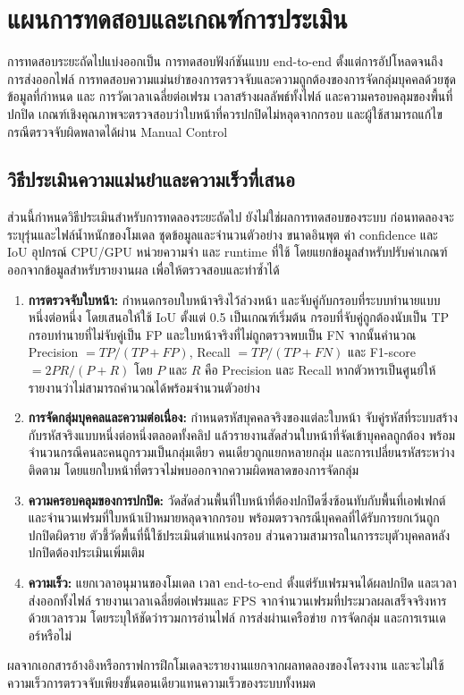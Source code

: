\section{แผนการทดสอบและเกณฑ์การประเมิน}

การทดสอบระยะถัดไปแบ่งออกเป็น การทดสอบฟังก์ชันแบบ end-to-end ตั้งแต่การอัปโหลดจนถึงการส่งออกไฟล์ การทดสอบความแม่นยำของการตรวจจับและความถูกต้องของการจัดกลุ่มบุคคลด้วยชุดข้อมูลที่กำหนด และ การวัดเวลาเฉลี่ยต่อเฟรม เวลาสร้างผลลัพธ์ทั้งไฟล์ และความครอบคลุมของพื้นที่ปกปิด เกณฑ์เชิงคุณภาพจะตรวจสอบว่าใบหน้าที่ควรปกปิดไม่หลุดจากกรอบ และผู้ใช้สามารถแก้ไขกรณีตรวจจับผิดพลาดได้ผ่าน Manual Control

\subsection{วิธีประเมินความแม่นยำและความเร็วที่เสนอ}

ส่วนนี้กำหนดวิธีประเมินสำหรับการทดลองระยะถัดไป ยังไม่ใช่ผลการทดสอบของระบบ ก่อนทดลองจะระบุรุ่นและไฟล์น้ำหนักของโมเดล ชุดข้อมูลและจำนวนตัวอย่าง ขนาดอินพุต ค่า confidence และ IoU อุปกรณ์ CPU/GPU หน่วยความจำ และ runtime ที่ใช้ โดยแยกข้อมูลสำหรับปรับค่าเกณฑ์ออกจากข้อมูลสำหรับรายงานผล เพื่อให้ตรวจสอบและทำซ้ำได้

\begin{enumerate}[
  label=(\arabic*),
  labelindent=0pt,
  leftmargin=\firstindentlength,
  labelwidth=0.65\firstindentlength,
  labelsep=0.35\firstindentlength,
  itemindent=0pt,
  align=left,
  listparindent=0pt,
  topsep=0.4\baselineskip,
  itemsep=0.4\baselineskip,
  parsep=0pt
]
  \item \textbf{การตรวจจับใบหน้า:} กำหนดกรอบใบหน้าจริงไว้ล่วงหน้า และจับคู่กับกรอบที่ระบบทำนายแบบหนึ่งต่อหนึ่ง โดยเสนอให้ใช้ IoU ตั้งแต่ 0.5 เป็นเกณฑ์เริ่มต้น กรอบที่จับคู่ถูกต้องนับเป็น TP กรอบทำนายที่ไม่จับคู่เป็น FP และใบหน้าจริงที่ไม่ถูกตรวจพบเป็น FN จากนั้นคำนวณ Precision $=TP/(TP+FP)$, Recall $=TP/(TP+FN)$ และ F1-score $=2PR/(P+R)$ โดย $P$ และ $R$ คือ Precision และ Recall หากตัวหารเป็นศูนย์ให้รายงานว่าไม่สามารถคำนวณได้พร้อมจำนวนตัวอย่าง
  \item \textbf{การจัดกลุ่มบุคคลและความต่อเนื่อง:} กำหนดรหัสบุคคลจริงของแต่ละใบหน้า จับคู่รหัสที่ระบบสร้างกับรหัสจริงแบบหนึ่งต่อหนึ่งตลอดทั้งคลิป แล้วรายงานสัดส่วนใบหน้าที่จัดเข้าบุคคลถูกต้อง พร้อมจำนวนกรณีคนละคนถูกรวมเป็นกลุ่มเดียว คนเดียวถูกแยกหลายกลุ่ม และการเปลี่ยนรหัสระหว่างติดตาม โดยแยกใบหน้าที่ตรวจไม่พบออกจากความผิดพลาดของการจัดกลุ่ม
  \item \textbf{ความครอบคลุมของการปกปิด:} วัดสัดส่วนพื้นที่ใบหน้าที่ต้องปกปิดซึ่งซ้อนทับกับพื้นที่เอฟเฟกต์ และจำนวนเฟรมที่ใบหน้าเป้าหมายหลุดจากกรอบ พร้อมตรวจกรณีบุคคลที่ได้รับการยกเว้นถูกปกปิดผิดราย ตัวชี้วัดพื้นที่นี้ใช้ประเมินตำแหน่งกรอบ ส่วนความสามารถในการระบุตัวบุคคลหลังปกปิดต้องประเมินเพิ่มเติม
  \item \textbf{ความเร็ว:} แยกเวลาอนุมานของโมเดล เวลา end-to-end ตั้งแต่รับเฟรมจนได้ผลปกปิด และเวลาส่งออกทั้งไฟล์ รายงานเวลาเฉลี่ยต่อเฟรมและ FPS จากจำนวนเฟรมที่ประมวลผลเสร็จจริงหารด้วยเวลารวม โดยระบุให้ชัดว่ารวมการอ่านไฟล์ การส่งผ่านเครือข่าย การจัดกลุ่ม และการเรนเดอร์หรือไม่
\end{enumerate}

ผลจากเอกสารอ้างอิงหรือกราฟการฝึกโมเดลจะรายงานแยกจากผลทดลองของโครงงาน และจะไม่ใช้ความเร็วการตรวจจับเพียงขั้นตอนเดียวแทนความเร็วของระบบทั้งหมด

